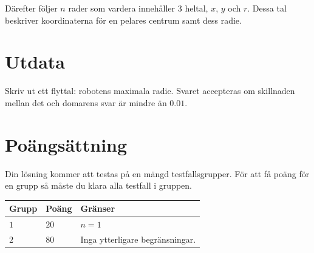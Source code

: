 Därefter följer $n$ rader som vardera innehåller 3 heltal, $x$, $y$ och $r$. Dessa tal beskriver koordinaterna
för en pelares centrum samt dess radie.


\section*{Utdata}
Skriv ut ett flyttal: robotens maximala radie. Svaret accepteras om skillnaden mellan det och domarens
svar är mindre än $0.01$.

\section*{Poängsättning}
Din lösning kommer att testas på en mängd testfallsgrupper.
För att få poäng för en grupp så måste du klara alla testfall i gruppen.

\noindent
\begin{tabular}{| l | l | p{12cm} |}
  \hline
  \textbf{Grupp} & \textbf{Poäng} & \textbf{Gränser} \\ \hline
  $1$    & $20$        & $n = 1$ \\ \hline
  $2$    & $80$       & Inga ytterligare begränsningar. \\ \hline
\end{tabular}
